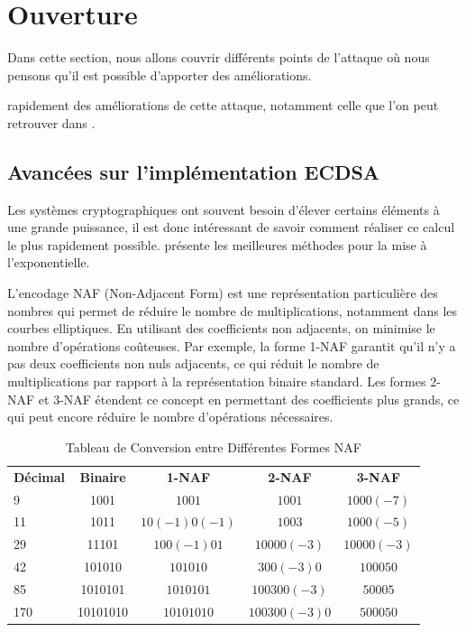 \documentclass{backend}
\begin{document}
\section{Ouverture} \label{sec:ouverture}

Dans cette section, nous allons couvrir différents points de l'attaque où nous pensons qu'il est possible d'apporter des améliorations.


rapidement des améliorations de cette attaque, notamment celle que l'on peut retrouver dans \cite{improvedECDSA}.

\subsection{Avancées sur l'implémentation ECDSA}

Les systèmes cryptographiques ont souvent besoin d'élever certains éléments à une grande puissance, il est donc intéressant de savoir comment réaliser ce calcul le plus rapidement possible.  \cite{fast_exp_method} présente les meilleures méthodes pour la mise à l'exponentielle.

L'encodage NAF (Non-Adjacent Form) est une représentation particulière des nombres qui permet de réduire le nombre de multiplications, notamment dans les courbes elliptiques. En utilisant des coefficients non adjacents, on minimise le nombre d'opérations coûteuses. Par exemple, la forme 1-NAF garantit qu'il n'y a pas deux coefficients non nuls adjacents, ce qui réduit le nombre de multiplications par rapport à la représentation binaire standard. Les formes 2-NAF et 3-NAF étendent ce concept en permettant des coefficients plus grands, ce qui peut encore réduire le nombre d'opérations nécessaires.

\begin{center}
    \begin{table}[htbp]
        \caption{Tableau de Conversion entre Différentes Formes NAF}
        \label{tab:comparaison_NAF}
        \centering
        \begin{tabular}{|l|cccc|}
            \toprule
            \textbf{Décimal} & \textbf{Binaire} & \textbf{1-NAF} & \textbf{2-NAF} & \textbf{3-NAF} \\
            9 & 1001 & $1001$ & $1 0 0 1$ & $1 0 0 0 (-7)$ \\
            11 & 1011 & $1 0 (-1) 0 (-1)$ & $1 0 0 3$ & $1 0 0 0 (-5)$ \\
            29 & 11101 & $1 0 0 (-1) 0 1$ & $1 0 0 0 0 (-3)$ & $1 0 0 0 0 (-3)$ \\
            42 & 101010 & $101010$ & $3 0 0 (-3) 0$ & $1 0 0 0 5 0$\\
            85 & 1010101 & $1010101$ & $1 0 0 3 0 0 (-3)$ & $5 0 0 0 5$ \\
            170 & 10101010 & $10101010$ & $1 0 0 3 0 0 (-3) 0$ & $5 0 0 0 5 0$ \\
            \hline
        \end{tabular}
    \end{table}
\end{center}
\end{document}

